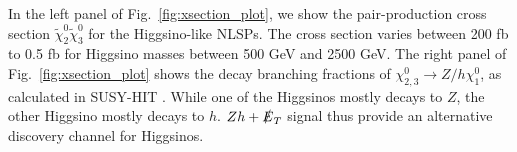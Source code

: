 \documentclass[a4paper,11pt]{article}
\newcommand{\Shufang}[1]{{\bf\color{Maroon}  #1}}
\newcommand{\image}[2]{\parbox{#1\textwidth}{\texttt{[image: images/\#2.pdf]}}}
\newcommand{\met}{{\slashed{E}_T}}
\begin{document}

In the left panel of Fig.~\ref{fig:xsection_plot}, we show the pair-production cross section $\widetilde\chi_2^0\widetilde\chi_3^0$ for the Higgsino-like NLSPs.  The cross section varies between
200 fb to 0.5 fb for Higgsino masses between 500 GeV and 2500 GeV. The right
panel of Fig.~\ref{fig:xsection_plot} shows the decay branching fractions of
$\chi_{2,3}^0\rightarrow Z/h \chi_1^0$, as calculated in SUSY-HIT \cite{Djouadi:2006bz}.
While one of the Higgsinos mostly decays to $Z$, the other
Higgsino mostly decays to $h$.  $Zh+\met$ signal thus provide an alternative
discovery channel for Higgsinos. 
\end{document}
